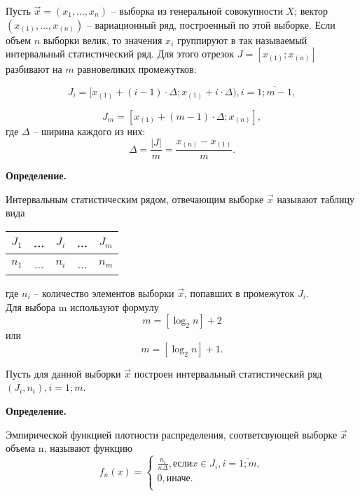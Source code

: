 Пусть $\vec x=(x_1, ..., x_n)$ -- выборка из генеральной совокупности $X$; вектор $(x_{(1)}, ..., x_{(n)})$ -- вариационный ряд, построенный по этой выборке.  Если объем $n$ выборки велик, то значения $x_i$ группируют в так называемый интервальный статистический ряд. Для этого отрезок $J = [x_{(1)}; x_{(n)}]$ разбивают на $m$ равновеликих промежутков:

\begin{equation*}
    J_i = [x_{(1)} + (i - 1) \cdot \Delta; x_{(1)} + i \cdot \Delta), i = \overline{1; m - 1},
\end{equation*}

\begin{equation*}
    J_{m} = [x_{(1)} + (m - 1) \cdot \Delta; x_{(n)}],
\end{equation*}
где $\Delta$ -- ширина каждого из них:
\begin{equation*}
    \Delta = \frac{|J|}{m} = \frac{x_{(n)} - x_{(1)}}{m}.
\end{equation*}

\textbf{Определение.}

Интервальным статистическим рядом, отвечающим выборке $\vec x$ называют таблицу вида

\begin{table}[htb]
    \centering
    \begin{tabular}{|c|c|c|c|c|}
        \hline
        $J_1$ & ... & $J_i$ & ... & $J_m$ \\
        \hline
        $n_1$ & ... & $n_i$ & ... & $n_m$ \\
        \hline
    \end{tabular}
\end{table}где $n_i$ -- количество элементов выборки $\vec x$, попавших в  промежуток $J_i$.
\\
Для выбора m используют формулу
\begin{equation*}
	m=[\log_2n]+2
\end{equation*}
или
\begin{equation*}
	m=[\log_2n]+1.
\end{equation*}


Пусть для данной выборки $\vec x$ построен интервальный статистический ряд $(J_i, n_i), i = \overline{1; m}$.

\textbf{Определение.}

Эмпирической функцией плотности распределения, соответсвующей выборке $\vec x$ объема n, называют функцию
\begin{equation*}
    f_n(x) =
    \begin{cases}
        \frac{n_i}{n \Delta}, \text{если} x \in J_i, i = \overline{1; m}, \\
        0, \text{иначе.} \\
    \end{cases}
\end{equation*}


